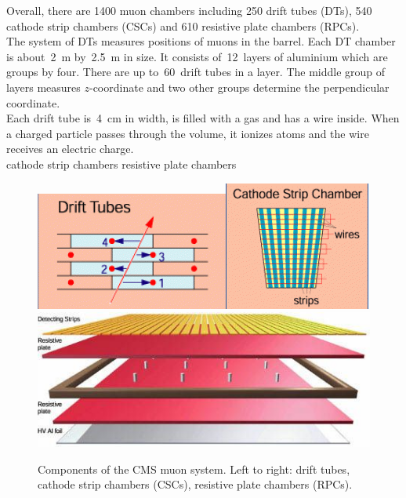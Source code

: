 Overall, there are 1400 muon chambers including 250 drift tubes (DTs), 540 cathode strip chambers (CSCs) and 610 resistive plate chambers (RPCs).\\

The system of DTs measures positions of muons in the barrel. Each DT chamber is about~2~m by~2.5~m in size. It consists of~12~layers of aluminium which are groups by four. There are up to~60~drift tubes in a layer. The middle group of layers measures $z$-coordinate and two other groups determine the perpendicular coordinate.\\

Each drift tube is~4~cm in width, is filled with a gas and has a wire inside. When a charged particle passes through the volume, it ionizes atoms and the wire receives an electric charge.\\



cathode strip chambers
resistive plate chambers

\begin{figure}[htb]
  \begin{center}
    \includegraphics[height=2.5 cm]{../figs/Exp/muonSystem_driftTubes.png}\quad\includegraphics[height=2.5 cm]{../figs/Exp/muonSystem_CSC.png}\quad\includegraphics[height=2.5 cm]{../figs/Exp/muonSystem_RPC.png}
    \caption{Components of the CMS muon system. Left to right: drift tubes, cathode strip chambers (CSCs), resistive plate chambers (RPCs).}
    \label{fig:muonSystem}
  \end{center}
\end{figure}


